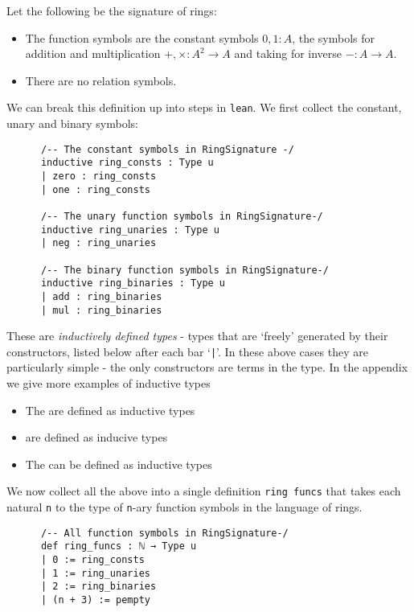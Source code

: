 \begin{dfn}
    Let the following be the signature of rings:
    \begin{itemize}
        \item The function symbols are the constant symbols $0, 1 : A$,
        the symbols for addition and multiplication $+ , \times : A^2 \to A$
        and taking for inverse $- : A \to A$.
        \item There are no relation symbols.
    \end{itemize}

    We can break this definition up into steps in \texttt{lean}.
    We first collect the constant, unary and binary symbols:

    \begin{lstlisting}
      /-- The constant symbols in RingSignature -/
      inductive ring_consts : Type u
      | zero : ring_consts
      | one : ring_consts

      /-- The unary function symbols in RingSignature-/
      inductive ring_unaries : Type u
      | neg : ring_unaries

      /-- The binary function symbols in RingSignature-/
      inductive ring_binaries : Type u
      | add : ring_binaries
      | mul : ring_binaries\end{lstlisting}

    These are \textit{inductively defined types} -
    types that are `freely' generated by their constructors,
    listed below after each bar `\texttt{|}'.
    In these above cases they are particularly simple -
    the only constructors are terms in the type.
    In the appendix we give more examples of inductive types
    \begin{itemize}
      \item The  are defined as inductive types
      \item {} are defined as inducive types
      \item The  can be defined as inductive types
    \end{itemize}

    We now collect all the above into a single definition \texttt{ring funcs}
    that takes each natural \texttt{n} to the type of \texttt{n}-ary
    function symbols in the language of rings.

    \begin{lstlisting}
      /-- All function symbols in RingSignature-/
      def ring_funcs : ℕ → Type u
      | 0 := ring_consts
      | 1 := ring_unaries
      | 2 := ring_binaries
      | (n + 3) := pempty\end{lstlisting}


\end{dfn}
